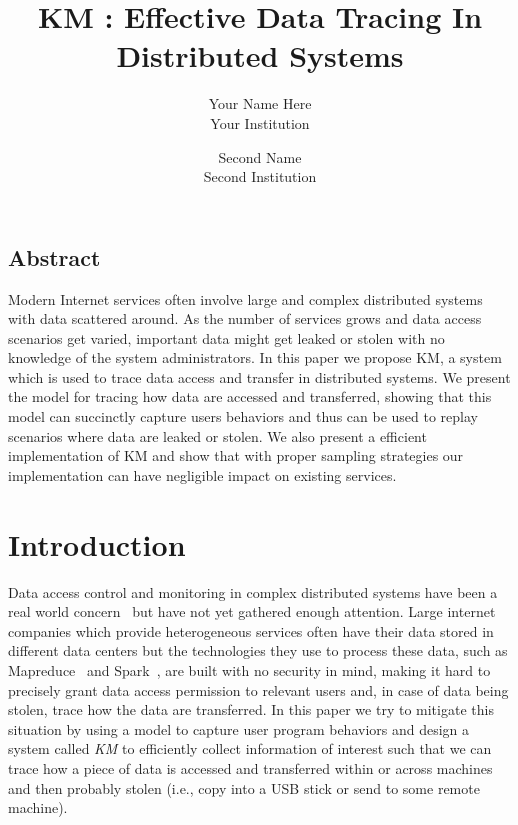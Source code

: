 \documentclass[letterpaper,twocolumn,10pt]{article}
\begin{document}
\date{}

\title{\Large \bf KM : Effective Data Tracing In Distributed Systems}

\author{
{\rm Your Name Here}\\
Your Institution\\
\and
{\rm Second Name}\\
Second Institution
} %

\maketitle

\thispagestyle{empty}


\subsection*{Abstract}
Modern Internet services often involve large and complex distributed systems
with data scattered around. As the number of services grows and data access
scenarios get varied, important data might get leaked or stolen with no
knowledge of the system administrators. In this paper we propose KM, a system
which is used to trace data access and transfer in distributed systems. We
present the model for tracing how data are accessed and transferred, showing
that this model can succinctly capture users behaviors and thus can be used
to replay scenarios where data are leaked or stolen. We also present a
efficient implementation of KM and show that with proper sampling strategies
our implementation can have negligible impact on existing services. 

\section{Introduction}
Data access control and monitoring in complex distributed systems have been a
real world concern~\cite{SomeBigPaper2009} but have not yet gathered enough
attention. Large internet companies which provide heterogeneous services
often have their data stored in different data centers but the technologies
they use to process these data, such as Mapreduce~\cite{mapreduce2003} and
Spark~\cite{spark2010}, are built with no security in mind, making it hard to
precisely grant data access permission to relevant users and, in case of data
being stolen, trace how the data are transferred. In this paper we try to
mitigate this situation by using a model to capture user program behaviors
and design a system called \textit{KM} to efficiently collect information of
interest such that we can trace how a piece of data is accessed and
transferred within or across machines and then probably stolen (i.e., copy
into a USB stick or send to some remote machine). 
\end{document}
